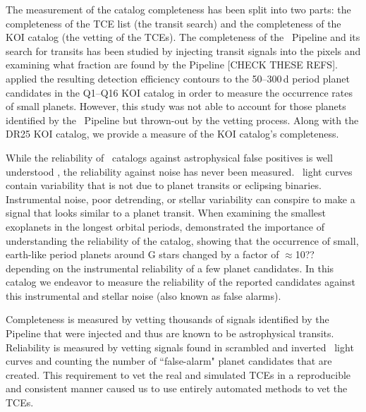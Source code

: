 The measurement of the catalog completeness has been split into two parts: the completeness of the TCE list (the transit search) and the completeness of the KOI catalog (the vetting of the TCEs). The completeness of the \Kepler\ Pipeline and its search for transits has been studied by injecting transit signals into the pixels and examining what fraction are found by the Pipeline \citep{Christiansen2015b,Christiansen2013a}[CHECK THESE REFS]. \citet{Burke2015} applied the resulting detection efficiency contours to the 50--300\,d period planet candidates in the Q1--Q16 KOI catalog \citep{Mullally2015cat} in order to measure the occurrence rates of small planets. However, this study was not able to account for those planets identified by the \Kepler\ Pipeline but thrown-out by the vetting process. Along with the DR25 KOI catalog, we provide a measure of the KOI catalog's completeness.

While the reliability of \Kepler\ catalogs against astrophysical false positives is well understood \citet[see e.g.][]{Morton2016,Torres2012}, the reliability against noise has never been measured.  \Kepler\ light curves contain variability that is not due to planet transits or eclipsing binaries.  Instrumental noise, poor detrending, or stellar variability can conspire to make a signal that looks similar to a planet transit. When examining the smallest exoplanets in the longest orbital periods, \citet{Burke2015} demonstrated the importance of understanding the reliability of the catalog, showing that the occurrence of small, earth-like period planets around G stars changed by a factor of $\approx$10?? depending on the instrumental reliability of a few planet candidates.  In this catalog we endeavor to measure the reliability of the reported candidates against this instrumental and stellar noise (also known as false alarms).  


Completeness is measured by vetting thousands of signals identified by the \Kepler Pipeline that were injected and thus are known to be astrophysical transits. Reliability is measured by vetting signals found in scrambled and inverted \Kepler\ light curves and counting the number of ``false-alarm" planet candidates that are created. This requirement to vet the real and simulated TCEs in a reproducible and consistent manner caused us to use entirely automated methods to vet the TCEs.  

